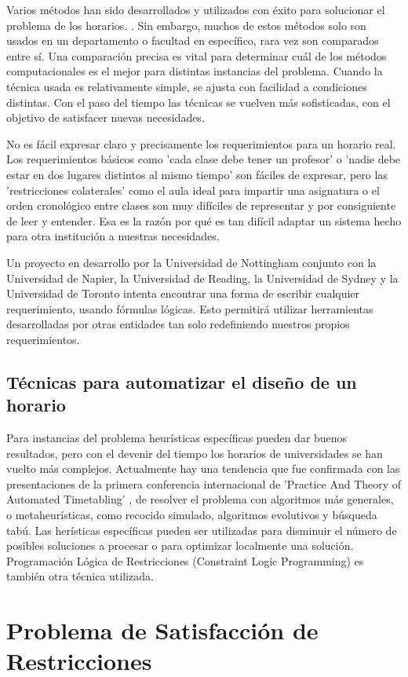 Varios métodos han sido desarrollados y utilizados con éxito para solucionar el problema de los horarios.
\cite{VA Bardadym, MW Carter, MW Carter and G Laporte, JH Kingston}. Sin embargo, muchos de estos métodos 
solo son usados en un departamento o facultad en específico, rara vez son comparados entre sí. Una 
comparación precisa es vital para determinar cuál de los métodos computacionales es el mejor para
distintas instancias del problema. Cuando la técnica usada es relativamente simple, se ajusta con facilidad
a condiciones distintas. Con el paso del tiempo las técnicas se vuelven más sofisticadas, con el objetivo
de satisfacer nuevas necesidades.

No es fácil expresar claro y precisamente los requerimientos para un horario real. Los requerimientos básicos
como 'cada clase debe tener un profesor' o 'nadie debe estar en dos lugares distintos al mismo tiempo' son
fáciles de expresar, pero las 'restricciones colaterales' como el aula ideal para impartir una asignatura o
el orden cronológico entre clases son muy difíciles de representar y por consiguiente de leer y entender. Esa
es la razón por qué es tan difícil adaptar un sistema hecho para otra institución a nuestras necesidades.

Un proyecto en desarrollo por la Universidad de Nottingham conjunto con la Universidad de Napier, la Universidad
de Reading, la Universidad de Sydney y la Universidad de Toronto intenta encontrar una forma de escribir cualquier
requerimiento, usando fórmulas lógicas. Esto permitirá utilizar herramientas desarrolladas por otras entidades tan
solo redefiniendo nuestros propios requerimientos.

\subsection{Técnicas para automatizar el diseño de un horario}

Para instancias del problema heurísticas específicas pueden dar buenos resultados, pero con el devenir del tiempo
los horarios de universidades se han vuelto más complejos. Actualmente hay una tendencia que fue confirmada
con las presentaciones de la primera conferencia internacional de 'Practice And Theory of Automated Timetabling'
\cite{D Abramson and J Abela}, de resolver el problema con algoritmos más generales, o metaheurísticas, como
recocido simulado, algoritmos evolutivos y búsqueda tabú. Las herísticas específicas pueden ser utilizadas
para disminuir el número de posibles soluciones a procesar o para optimizar localmente una solución. Programación
Lógica de Restricciones (Constraint Logic Programming) es también otra técnica utilizada.

\section{Problema de Satisfacción de Restricciones}
